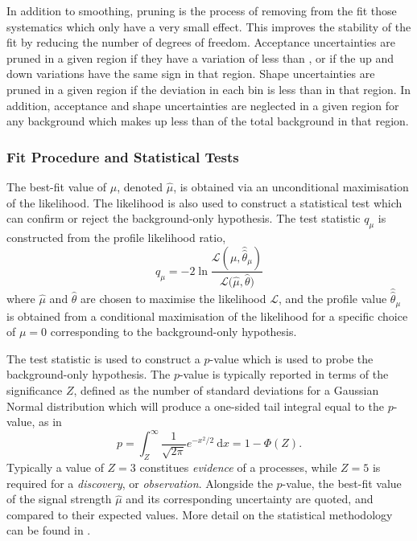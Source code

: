 In addition to smoothing, pruning is the process of removing from the fit those systematics which only have a very small effect.
This improves the stability of the fit by reducing the number of degrees of freedom.
Acceptance uncertainties are pruned in a given region if they have a variation of less than , or if the up and down variations have the same sign in that region.
Shape uncertainties are pruned in a given region if the deviation in each bin is less than  in that region.
In addition, acceptance and shape uncertainties are neglected in a given region for any background which makes up less than  of the total background in that region.


\subsubsection{Fit Procedure and Statistical Tests}

The best-fit value of $\mu$, denoted $\hat\mu$, is obtained via an unconditional maximisation of the likelihood.
The likelihood is also used to construct a statistical test which can confirm or reject the background-only hypothesis.
The test statistic $q_\mu$ is constructed from the profile likelihood ratio,
%
\begin{equation}
  q_\mu = -2 \ln \frac{\mathcal{L(\mu, \hat{\hat{\theta}}_\mu )} } { \mathcal{L(\hat{\mu}, \hat{\theta}}) }
\end{equation}
%
where $\hat{\mu}$ and $\hat{\theta}$ are chosen to maximise the likelihood $\mathcal{L}$, and the profile value $\hat{\hat{\theta}}_\mu$ is obtained from a conditional maximisation of the likelihood for a specific choice of $\mu = 0$ corresponding to the background-only hypothesis.

The test statistic is used to construct a $p$-value which is used to probe the background-only hypothesis.
The $p$-value is typically reported in terms of the significance $Z$, defined as the number of standard deviations for a Gaussian Normal distribution which will produce a one-sided tail integral equal to the $p$-value, as in
%
\begin{equation}
  p = \int_Z^{\infty} \frac{1}{\sqrt{2 \pi}} e^{-x^2/2} ~\mathrm{d} x
  = 1 - \Phi(Z) .
\end{equation}
%
Typically a value of $Z=3$ constitues \textit{evidence} of a processes, while $Z=5$ is required for a \textit{discovery}, or \textit{observation}.
Alongside the $p$-value, the best-fit value of the signal strength $\hat\mu$ and its corresponding uncertainty are quoted, and compared to their expected values.
More detail on the statistical methodology can be found in .

